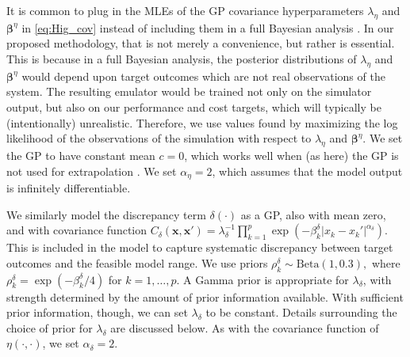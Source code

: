 \documentclass[12pt]{article}
\begin{document}
%
It is common to plug in the MLEs of the GP covariance hyperparameters $\lambda_\eta$ and $\boldsymbol \beta^\eta$ in \eqref{eq:Hig_cov} instead of including them in a full Bayesian analysis \citep{Kennedy2001,Santner2003a,Qian2008,Paulo2012}.
%
In our proposed methodology, that is not merely a convenience, but rather is essential.
%
This is because in a full Bayesian analysis, the posterior distributions of $\lambda_\eta$ and $\boldsymbol\beta^\eta$ would depend upon target outcomes which are not real observations of the system.
%
The resulting emulator would be trained not only on the simulator output, but also on our performance and cost targets, which will typically be (intentionally) unrealistic.
%
Therefore, we use values found by maximizing the log likelihood of the observations of the simulation with respect to $\lambda_\eta$ and $\boldsymbol\beta^\eta$.
%
We set the GP to have constant mean $c=0$, which works well when (as here) the GP is not used for extrapolation \citep{Bayarri2007}.
%
We set $\alpha_\eta = 2$, which assumes that the model output is infinitely differentiable.

We similarly model the discrepancy term $\delta(\cdot)$ as a GP, also with mean zero, and with covariance function
%
$C_\delta(\mathbf x,\mathbf x') = \lambda_\delta^{-1} \prod_{k=1}^p
\exp\left( -\beta_k^\delta |x_k-x_k'|^{\alpha_\delta} \right).$
%
This is included in the model to capture systematic discrepancy between target outcomes and the feasible model range.
%
We use priors
$\rho^\delta_k \sim \mathrm{Beta}(1,0.3),$
where $\rho_k^\delta = \exp(-\beta_k^\delta/4)$ for $k=1,\ldots,p$. 
%
A Gamma prior is appropriate for $\lambda_\delta$, with strength determined by the amount of prior information available. 
%
With sufficient prior information, though, we can set $\lambda_\delta$ to be constant. 
%
Details surrounding the choice of prior for $\lambda_\delta$ are discussed below.
%
As with the covariance function of $\eta(\cdot,\cdot)$, we set $\alpha_\delta=2$.
\end{document}
